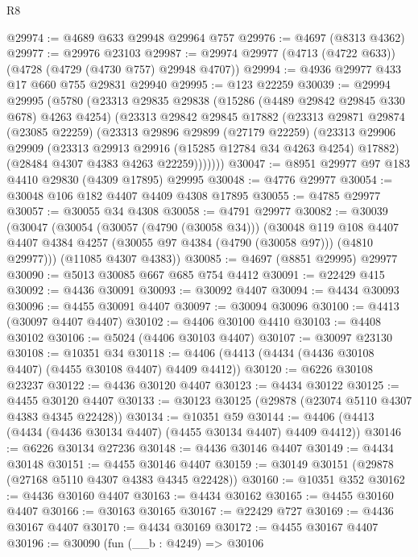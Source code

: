 \begin{lexlean}{R8}
\begin{coremodule}
@29974 := @4689 @633 @29948 @29964 @757
@29976 := @4697 (@8313 @4362)
@29977 := @29976 @23103
@29987 := @29974 @29977 (@4713 (@4722 @633)) (@4728 (@4729 (@4730 @757) @29948 @4707))
@29994 := @4936 @29977 @433 @17 @660 @755 @29831 @29940
@29995 := @123 @22259
@30039 := @29994
    @29995
    (@5780
      (@23313
        @29835
        @29838
        (@15286 (@4489 @29842 @29845 @330 @678) @4263 @4254)
        (@23313
          @29842
          @29845
          @17882
          (@23313
            @29871
            @29874
            (@23085 @22259)
            (@23313
              @29896
              @29899
              (@27179 @22259)
              (@23313
                @29906
                @29909
                (@23313 @29913 @29916 (@15285 @12784 @34 @4263 @4254) @17882)
                (@28484 @4307 @4383 @4263 @22259)))))))
@30047 := @8951 @29977 @97 @183 @4410 @29830 (@4309 @17895) @29995
@30048 := @4776 @29977
@30054 := @30048 @106 @182 @4407 @4409 @4308 @17895
@30055 := @4785 @29977
@30057 := @30055 @34 @4308
@30058 := @4791 @29977
@30082 := @30039
    (@30047
      (@30054
        (@30057 (@4790 (@30058 @34)))
        (@30048
          @119
          @108
          @4407
          @4407
          @4384
          @4257
          (@30055 @97 @4384 (@4790 (@30058 @97)))
          (@4810 @29977)))
      (@11085 @4307 @4383))
@30085 := @4697 (@8851 @29995) @29977
@30090 := @5013 @30085 @667 @685 @754 @4412
@30091 := @22429 @415
@30092 := @4436 @30091
@30093 := @30092 @4407
@30094 := @4434 @30093
@30096 := @4455 @30091 @4407
@30097 := @30094 @30096
@30100 := @4413 (@30097 @4407 @4407)
@30102 := @4406 @30100 @4410
@30103 := @4408 @30102
@30106 := @5024 (@4406 @30103 @4407)
@30107 := @30097 @23130
@30108 := @10351 @34
@30118 := @4406 (@4413 (@4434 (@4436 @30108 @4407) (@4455 @30108 @4407) @4409 @4412))
@30120 := @6226 @30108 @23237
@30122 := @4436 @30120 @4407
@30123 := @4434 @30122
@30125 := @4455 @30120 @4407
@30133 := @30123 @30125 (@29878 (@23074 @5110 @4307 @4383 @4345 @22428))
@30134 := @10351 @59
@30144 := @4406 (@4413 (@4434 (@4436 @30134 @4407) (@4455 @30134 @4407) @4409 @4412))
@30146 := @6226 @30134 @27236
@30148 := @4436 @30146 @4407
@30149 := @4434 @30148
@30151 := @4455 @30146 @4407
@30159 := @30149 @30151 (@29878 (@27168 @5110 @4307 @4383 @4345 @22428))
@30160 := @10351 @352
@30162 := @4436 @30160 @4407
@30163 := @4434 @30162
@30165 := @4455 @30160 @4407
@30166 := @30163 @30165
@30167 := @22429 @727
@30169 := @4436 @30167 @4407
@30170 := @4434 @30169
@30172 := @4455 @30167 @4407
@30196 := @30090
    (fun (__b : @4249) =>
    @30106

\end{coremodule}
\end{lexlean}
